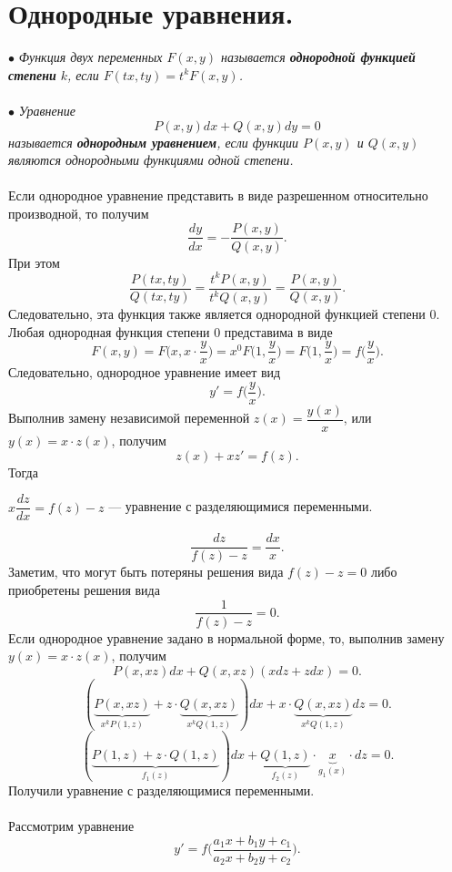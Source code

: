 \documentclass[a4paper, 12pt]{report}
\begin{document}
\section{Однородные уравнения.}
$\bullet$ \textit{Функция двух переменных $F(x,y)$ называется \textbf{однородной функцией степени} $k$, если $F(tx,ty) = t^kF(x,y)$.}\\\\
$\bullet$ \textit{Уравнение $$P(x,y)dx + Q(x,y)dy = 0$$ называется \textbf{однородным уравнением}, если функции $P(x,y)$ и $Q(x,y)$ являются однородными функциями одной степени.}\\\\
Если однородное уравнение представить в виде разрешенном относительно производной, то получим $$\dfrac{dy}{dx} = -\dfrac{P(x,y)}{Q(x,y)}.$$
При этом $$\dfrac{P(tx,ty)}{Q(tx,ty)} = \dfrac{t^kP(x,y)}{t^kQ(x,y)} = \dfrac{P(x,y)}{Q(x,y)}.$$
Следовательно, эта функция также является однородной функцией степени 0. Любая однородная функция степени 0 представима в виде $$F(x,y) = F\Big(x,x\cdot \dfrac{y}{x}\Big) = x^0F\Big(1, \dfrac{y}{x}\Big) =F\Big(1,\dfrac{y}{x}\Big) = f\Big(\dfrac{y}{x}\Big).$$
Следовательно, однородное уравнение имеет вид $$y' = f\Big(\dfrac{y}{x}\Big).$$
Выполнив замену независимой переменной $z(x) = \dfrac{y(x)}{x}$, или $y(x) = x\cdot z(x)$, получим $$z(x) + xz' = f(z).$$
Тогда \begin{center}
	$x\dfrac{dz}{dx} = f(z) - z$ --- уравнение с разделяющимися переменными.
\end{center}
$$\dfrac{dz}{f(z) - z} = \dfrac{dx}{x}.$$
Заметим, что могут быть потеряны решения вида $f(z) - z = 0$ либо приобретены решения вида $$\dfrac{1}{f(z) - z} = 0.$$
Если однородное уравнение задано в нормальной форме, то, выполнив замену $y(x) = x\cdot z(x)$, получим $$P(x,xz)dx + Q(x,xz) (xdz + zdx) = 0.$$
$$(\underbrace{P(x,xz)}_{x^kP(1,z)} + z\cdot \underbrace{Q(x,xz)}_{x^kQ(1,z)})dx +x\cdot  \underbrace{Q(x,xz)}_{x^kQ(1,z)}dz = 0.$$
$$(\underbrace{P(1,z) + z\cdot Q(1,z)}_{f_1(z)})dx + \underbrace{Q(1,z)}_{f_2(z)}\cdot \underbrace{x}_{g_1(x)}\cdot dz = 0.$$
Получили уравнение с разделяющимися переменными.\\\\
Рассмотрим уравнение  $$y' = f\Big(\dfrac{a_1x + b_1y + c_1}{a_2 x + b_2y + c_2}\Big).$$
\end{document}
